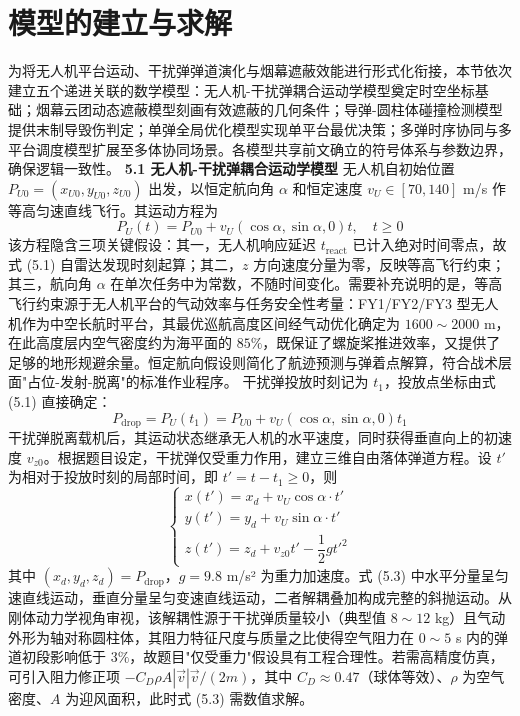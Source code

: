 \documentclass{JXUSTmodeling}
\begin{document}
\section{模型的建立与求解}
为将无人机平台运动、干扰弹弹道演化与烟幕遮蔽效能进行形式化衔接，本节依次建立五个递进关联的数学模型：无人机-干扰弹耦合运动学模型奠定时空坐标基础；烟幕云团动态遮蔽模型刻画有效遮蔽的几何条件；导弹-圆柱体碰撞检测模型提供末制导毁伤判定；单弹全局优化模型实现单平台最优决策；多弹时序协同与多平台调度模型扩展至多体协同场景。各模型共享前文确立的符号体系与参数边界，确保逻辑一致性。
\textbf{5.1 无人机-干扰弹耦合运动学模型}
无人机自初始位置 $P_{U0}=(x_{U0}, y_{U0}, z_{U0})$ 出发，以恒定航向角 $\alpha$ 和恒定速度 $v_U\in[70,140]$ m/s 作等高匀速直线飞行。其运动方程为
\begin{equation}
P_U(t)=P_{U0}+v_U(\cos\alpha,\sin\alpha,0)t,\quad t\geq 0 \tag{5.1}
\end{equation}
该方程隐含三项关键假设：其一，无人机响应延迟 $t_{\text{react}}$ 已计入绝对时间零点，故式 (5.1) 自雷达发现时刻起算；其二，$z$ 方向速度分量为零，反映等高飞行约束；其三，航向角 $\alpha$ 在单次任务中为常数，不随时间变化。需要补充说明的是，等高飞行约束源于无人机平台的气动效率与任务安全性考量：FY1/FY2/FY3 型无人机作为中空长航时平台，其最优巡航高度区间经气动优化确定为 $1600\sim 2000$ m，在此高度层内空气密度约为海平面的 $85\%$，既保证了螺旋桨推进效率，又提供了足够的地形规避余量。恒定航向假设则简化了航迹预测与弹着点解算，符合战术层面"占位-发射-脱离"的标准作业程序。
干扰弹投放时刻记为 $t_1$，投放点坐标由式 (5.1) 直接确定：
\begin{equation}
P_{\text{drop}}=P_U(t_1)=P_{U0}+v_U(\cos\alpha,\sin\alpha,0)t_1 \tag{5.2}
\end{equation}
干扰弹脱离载机后，其运动状态继承无人机的水平速度，同时获得垂直向上的初速度 $v_{z0}$。根据题目设定，干扰弹仅受重力作用，建立三维自由落体弹道方程。设 $t'$ 为相对于投放时刻的局部时间，即 $t'=t-t_1\geq 0$，则
\begin{equation}
\begin{cases}
x(t')=x_d+v_U\cos\alpha\cdot t'\\[4pt]
y(t')=y_d+v_U\sin\alpha\cdot t'\\[4pt]
z(t')=z_d+v_{z0}t'-\dfrac{1}{2}gt'^2
\end{cases} \tag{5.3}
\end{equation}
其中 $(x_d,y_d,z_d)=P_{\text{drop}}$，$g=9.8$ m/s² 为重力加速度。式 (5.3) 中水平分量呈匀速直线运动，垂直分量呈匀变速直线运动，二者解耦叠加构成完整的斜抛运动。从刚体动力学视角审视，该解耦性源于干扰弹质量较小（典型值 $8\sim 12$ kg）且气动外形为轴对称圆柱体，其阻力特征尺度与质量之比使得空气阻力在 $0\sim 5$ s 内的弹道初段影响低于 $3\%$，故题目"仅受重力"假设具有工程合理性。若需高精度仿真，可引入阻力修正项 $-C_D\rho A|\vec{v}|\vec{v}/(2m)$，其中 $C_D\approx 0.47$（球体等效）、$\rho$ 为空气密度、$A$ 为迎风面积，此时式 (5.3) 需数值求解。
\end{document}
